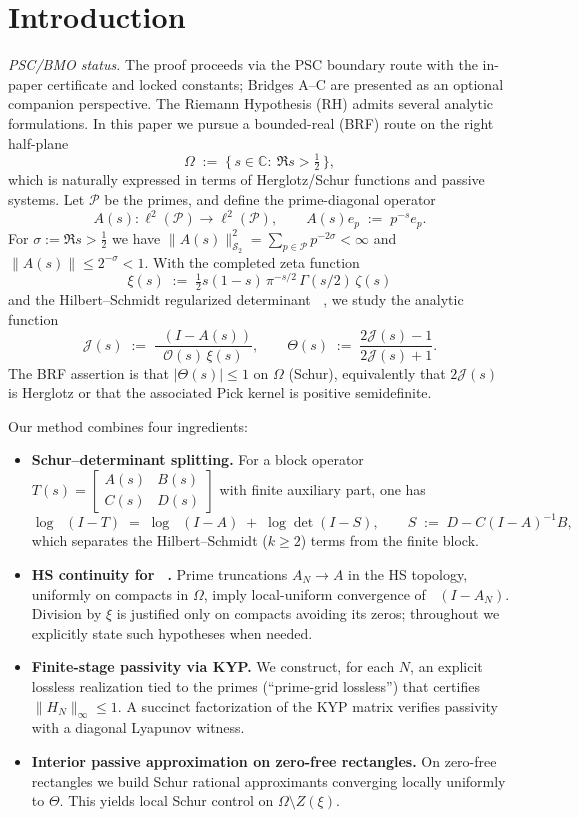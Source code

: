 \documentclass[11pt]{article}
\theoremstyle{definition}
\theoremstyle{remark}
\newcommand{\C}{\mathbb{C}}
\newcommand{\PP}{\mathcal{P}}
\newcommand{\HS}{\mathcal{S}_2}
\newcommand{\Half}{\{\,s\in\C:\ \Re s>\tfrac12\,\}}
\DeclareMathOperator{\dettwo}{det_2}
\begin{document}
\section{Introduction}
\noindent\textit{PSC/BMO status.} The proof proceeds via the PSC boundary route with the in-paper certificate and locked constants; Bridges A--C are presented as an optional companion perspective.
The Riemann Hypothesis (RH) admits several analytic formulations. In this paper we pursue a bounded-real (BRF) route on the right half-plane
\[
 \Omega\;:=\;\Half,
\]
which is naturally expressed in terms of Herglotz/Schur functions and passive systems. Let \(\PP\) be the primes, and define the prime-diagonal operator
\[
 A(s):\ell^2(\PP)\to\ell^2(\PP),\qquad A(s)e_p\;:=\;p^{-s}e_p.
\]
For \(\sigma:=\Re s>\tfrac12\) we have \(\|A(s)\|_{\HS}^2=\sum_{p\in\PP}p^{-2\sigma}<\infty\) and \(\|A(s)\|\le 2^{-\sigma}<1\). With the completed zeta function
\[
 \xi(s)\;:=\;\tfrac12 s(1-s)\,\pi^{-s/2}\,\Gamma(s/2)\,\zeta(s)
\]
and the Hilbert--Schmidt regularized determinant \(\dettwo\), we study the analytic function
\[
 \mathcal J(s)\;:=\;\frac{\dettwo(I-A(s))}{\mathcal O(s)\,\xi(s)},\qquad \Theta(s)\;:=\;\frac{2\mathcal J(s)-1}{2\mathcal J(s)+1}.
\]
The BRF assertion is that \(|\Theta(s)|\le 1\) on \(\Omega\) (Schur), equivalently that \(2\mathcal J(s)\) is Herglotz or that the associated Pick kernel is positive semidefinite.

Our method combines four ingredients:
\begin{itemize}
 \item \textbf{Schur--determinant splitting.} For a block operator \(T(s)=\begin{bmatrix}A(s)&B(s)\\ C(s)&D(s)\end{bmatrix}\) with finite auxiliary part, one has
 \[
  \log\dettwo(I-T)\;=\;\log\dettwo(I-A)\; +\; \log\det(I-S),\qquad S\;:=\;D-C(I-A)^{-1}B,
 \]
 which separates the Hilbert--Schmidt (\(k\ge 2\)) terms from the finite block.
 \item \textbf{HS continuity for \(\dettwo\).} Prime truncations \(A_N\to A\) in the HS topology, uniformly on compacts in \(\Omega\), imply local-uniform convergence of \(\dettwo(I-A_N)\). Division by \(\xi\) is justified only on compacts avoiding its zeros; throughout we explicitly state such hypotheses when needed.
 \item \textbf{Finite-stage passivity via KYP.} We construct, for each \(N\), an explicit lossless realization tied to the primes (``prime-grid lossless'') that certifies \(\|H_N\|_\infty\le 1\). A succinct factorization of the KYP matrix verifies passivity with a diagonal Lyapunov witness.
 \item \textbf{Interior passive approximation on zero-free rectangles.} On zero-free rectangles we build Schur rational approximants converging locally uniformly to \(\Theta\). This yields local Schur control on \(\Omega\setminus Z(\xi)\).
\end{itemize}
\end{document}
